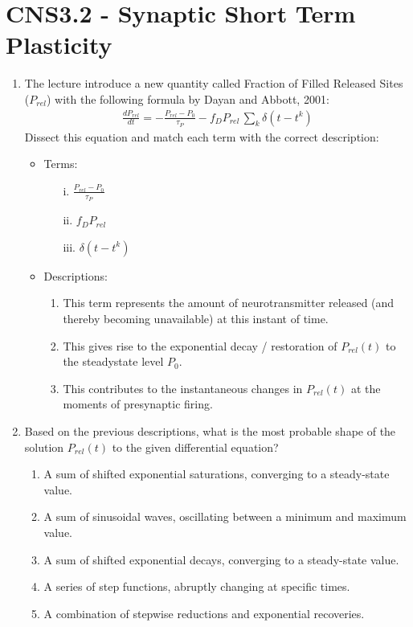 \documentclass[11pt,letterpaper]{article}
\begin{document}
\section{CNS3.2 - Synaptic Short Term Plasticity}
\begin{enumerate}
    \item The lecture introduce a new quantity called Fraction of Filled Released Sites ($P_{rel}$) with the following formula by Dayan and Abbott, 2001:
    \begin{align*}
        \frac{d P_{rel}}{dt} = -\frac{P_{rel} - P_0}{\tau_P} - f_D P_{rel} \, \sum_k \delta(t - t^k)
    \end{align*}
    Dissect this equation and match each term with the correct description:
    \begin{itemize}
        \item Terms: 
        \begin{enumerate}
            \item[i.] $\frac{P_{rel} - P_0}{\tau_P}$
            \item[ii.] $f_D P_{rel}$
            \item[iii.] $\delta(t - t^k)$
        \end{enumerate}
    \end{itemize}
    \begin{itemize}
        \item Descriptions: 
        \begin{enumerate}
            \item This term represents the amount of neurotransmitter released (and thereby becoming unavailable) at this instant of time.
            \item This gives rise to the exponential decay / restoration of $P_{rel} (t)$ to the steadystate level $P_0$.
            \item This contributes to the instantaneous changes in $P_{rel} (t)$ at the moments of presynaptic firing.
        \end{enumerate}
    \end{itemize}

    \item Based on the previous descriptions, what is the most probable shape of the solution $P_{rel}(t)$ to the given differential equation?
    \begin{enumerate}
        \item A sum of shifted exponential saturations, converging to a steady-state value.
        \item A sum of sinusoidal waves, oscillating between a minimum and maximum value.
        \item A sum of shifted exponential decays, converging to a steady-state value.
        \item A series of step functions, abruptly changing at specific times.
        \item A combination of stepwise reductions and exponential recoveries.
    \end{enumerate}

\end{enumerate}
\end{document}
